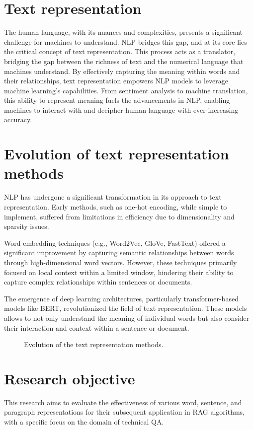 \section{Text representation}
The human language, with its nuances and complexities, presents a significant challenge for machines to understand.
\ac{NLP} bridges this gap, and at its core lies the critical concept of text representation.
This process acts as a translator, bridging the gap between the richness of text and the numerical language that machines understand.
By effectively capturing the meaning within words and their relationships, text representation empowers \ac{NLP} models to leverage machine learning's capabilities.
From sentiment analysis to machine translation, this ability to represent meaning fuels the advancements in \ac{NLP}, enabling machines to interact with and decipher human language with ever-increasing accuracy.

\section{Evolution of text representation methods}

\ac{NLP} has undergone a significant transformation in its approach to text representation.
Early methods, such as one-hot encoding, while simple to implement, suffered from limitations in efficiency due to dimensionality and sparsity issues.

Word embedding techniques (e.g., Word2Vec, \ac{GloVe}, FastText) offered a significant improvement by capturing semantic relationships between words through high-dimensional word vectors.
However, these techniques primarily focused on local context within a limited window, hindering their ability to capture complex relationships within sentences or documents.

The emergence of deep learning architectures, particularly transformer-based models like \ac{BERT}, revolutionized the field of text representation.
These models allows to not only understand the meaning of individual words but also consider their interaction and context within a sentence or document.

\begin{figure}
  \centering
    
  \caption{Evolution of the text representation methods.}
  \label{fig:ecolution_text_representation}
\end{figure}

\section{Research objective}

This research aims to evaluate the effectiveness of various word, sentence, and paragraph representations for their subsequent application in \ac{RAG} algorithms, with a specific focus on the domain of technical \ac{QA}.